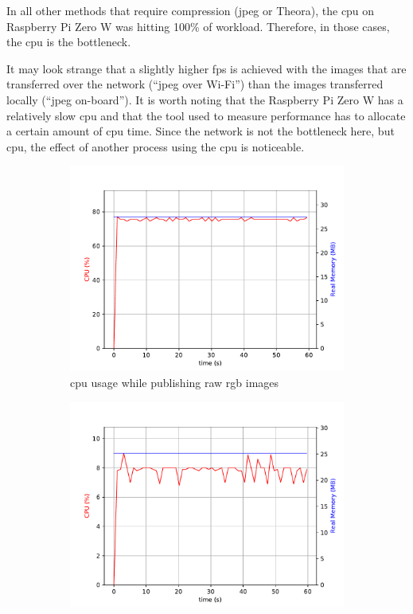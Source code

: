 In all other methods that require compression (\ac{jpeg} or Theora), the \ac{cpu} on Raspberry Pi Zero W was hitting 100\% of workload.
Therefore, in those cases, the \ac{cpu} is the bottleneck.

It may look strange that a slightly higher \ac{fps} is achieved with the images that are transferred over the network (``\ac{jpeg} over Wi-Fi'') than the images transferred locally (``\ac{jpeg} on-board''). 
It is worth noting that the Raspberry Pi Zero W has a relatively slow \ac{cpu} and that the tool used to measure performance has to allocate a certain amount of \ac{cpu} time.
Since the network is not the bottleneck here, but \ac{cpu}, the effect of another process using the \ac{cpu} is noticeable.

\begin{figure}[H]
\centering
\begin{subfigure}{.8\textwidth}
  \centering
  \includegraphics[width=\linewidth]{results/figures/camera_raw_cpu}
  \caption{\ac{cpu} usage while publishing raw \ac{rgb} images}
  \label{fig:results:camera_load:raw_cpu}
\end{subfigure}
\begin{subfigure}{.8\textwidth}
  \centering
  \includegraphics[width=\linewidth]{results/figures/camera_jpeg_gpu.pdf}

\end{subfigure}
\end{figure}
